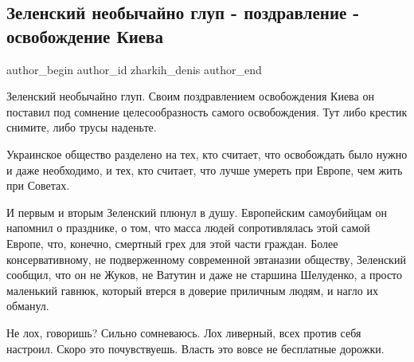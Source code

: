  
 
 
 
 
 
\subsection{Зеленский необычайно глуп - поздравление - освобождение Киева}
\label{sec:07_11_2021.fb.zharkih_denis.1.glupost_zelja_osvobozhdenie_kieva}
 
\ifcmt
 author_begin
   author_id zharkih_denis
 author_end
\fi

Зеленский необычайно глуп. Своим поздравлением освобождения Киева он поставил
под сомнение целесообразность самого освобождения. Тут либо крестик снимите,
либо трусы наденьте. 

Украинское общество разделено на тех, кто считает, что освобождать было нужно и
даже необходимо, и тех, кто считает, что лучше умереть при Европе, чем жить при
Советах. 

И первым и вторым Зеленский плюнул в душу. Европейским самоубийцам он напомнил
о празднике, о том, что масса людей сопротивлялась этой самой Европе, что,
конечно, смертный грех для этой части граждан. Более консервативному, не
подверженному современной эвтаназии обществу, Зеленский сообщил, что он не
Жуков, не Ватутин и даже не старшина Шелуденко, а просто маленький гавнюк,
который втерся в доверие приличным людям, и нагло их обманул.  

Не лох, говоришь? Сильно сомневаюсь. Лох ливерный, всех против себя настроил.
Скоро это почувствуешь. Власть это вовсе не бесплатные дорожки.

